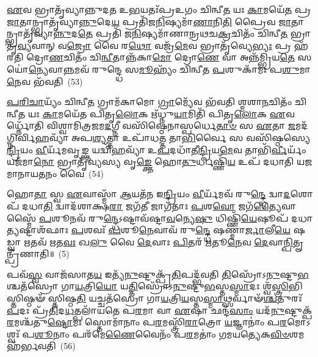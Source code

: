 \-\ul{𑌏}\-𑌵 𑌭𑍍𑌰𑌾𑌤𑍃᳴𑌵𑍍𑌯𑌾𑌨𑍍𑌨𑍁𑌦𑌤 𑌉\-\ul{𑌭}\-𑌯𑌤𑌃᳴𑌪𑍍𑌰𑌉𑌗𑌂 𑌚𑌿𑌨𑍍𑌵𑍀\-\ul{𑌤} 𑌯𑌃 \ul{𑌕𑌾}\-𑌮𑌯𑍇᳴\-\ul{𑌤} 𑌪𑍍𑌰 \ul{𑌜𑌾}\-𑌤𑌾𑌨𑍍𑌭𑍍𑌰𑌾𑌤𑍃᳴𑌵𑍍𑌯𑌾\-\ul{𑌨𑍍𑌨𑍁}\-𑌦𑍇\-\ul{𑌯} 𑌪𑍍𑌰𑌤𑌿᳴𑌜\-\ul{𑌨𑌿}\-𑌷𑍍𑌯𑌮𑌾᳴\-\ul{𑌣𑌾}\-𑌨𑌿\-\ul{𑌤𑌿} 𑌪𑍍𑌰𑍈𑌵 \ul{𑌜𑌾}\-𑌤𑌾𑌨𑍍𑌭𑍍𑌰𑌾𑌤𑍃᳴𑌵𑍍𑌯𑌾\-\ul{𑌨𑍍𑌨𑍁}\-𑌦\-\ul{𑌤𑍇} 𑌪𑍍𑌰𑌤𑌿᳴ 𑌜\-\ul{𑌨𑌿}\-𑌷𑍍𑌯𑌮𑌾᳴𑌣𑌾𑌨𑍍𑌰𑌥𑌚\-\ul{𑌕𑍍𑌰}\-𑌚𑌿𑌤𑌂᳴ 𑌚𑌿𑌨𑍍𑌵𑍀\-\ul{𑌤} 𑌭𑍍𑌰𑌾𑌤𑍃᳴\-\ul{𑌵𑍍𑌯}\-𑌵𑌾𑌨𑍍 𑌵\-\ul{𑌜𑍍𑌰𑍋} 𑌵𑍈 𑌰\-\ul{𑌥𑍋} 𑌵𑌜𑍍𑌰᳴\-\ul{𑌮𑍇}\-𑌵 𑌭𑍍𑌰𑌾𑌤𑍃᳴𑌵𑍍𑌯𑍇\-\ul{𑌭𑍍𑌯𑌃} 𑌪𑍍𑌰 𑌹᳴𑌰𑌤𑌿 𑌦𑍍𑌰𑍋\-\ul{𑌣}\-𑌚𑌿𑌤𑌂᳴ 𑌚𑌿\-\ul{𑌨𑍍𑌵𑍀}\-𑌤𑌾𑌨𑍍𑌨᳴𑌕𑌾\-\ul{𑌮𑍋} 𑌦𑍍𑌰𑍋\-\ul{𑌣𑍇} 𑌵𑌾 𑌅𑌨𑍍𑌨᳴𑌮𑍍𑌭𑍍𑌰𑌿𑌯\-\ul{𑌤𑍇} 𑌸𑌯𑍋॑\-\ul{𑌨𑍍𑌯𑍇}\-𑌵𑌾\-\ul{𑌨𑍍𑌨}\-𑌮𑌵᳴ 𑌰𑍁𑌨𑍍𑌦𑍍𑌧𑍇 𑌸\-\ul{𑌮𑍂}\-𑌹𑍍𑌯𑌂᳴ 𑌚𑌿𑌨𑍍𑌵𑍀𑌤 \ul{𑌪}\-𑌶𑍁𑌕𑌾᳴𑌮𑌃 𑌪\-\ul{𑌶𑍁}\-𑌮𑌾\-\ul{𑌨𑍇}\-𑌵 𑌭᳴𑌵𑌤𑌿~(53)

\-\ul{𑌪}\-\-\ul{𑌰𑌿}\-\-\ul{𑌚𑌾}\-𑌯𑍍𑌯𑌂᳴ 𑌚𑌿𑌨𑍍𑌵𑍀\-\ul{𑌤} 𑌗𑍍𑌰𑌾𑌮᳴𑌕𑌾𑌮𑍋 \ul{𑌗𑍍𑌰𑌾}\-𑌮𑍍𑌯𑍇᳴𑌵 𑌭᳴𑌵𑌤𑌿 𑌶𑍍𑌮𑌶𑌾\-\ul{𑌨}\-𑌚𑌿𑌤𑌂᳴ 𑌚𑌿𑌨𑍍𑌵𑍀\-\ul{𑌤} 𑌯𑌃 \ul{𑌕𑌾}\-𑌮𑌯𑍇᳴𑌤 𑌪𑌿𑌤𑍃\-\ul{𑌲𑍋}\-𑌕 𑌋᳴𑌧𑍍𑌨𑍁\-\ul{𑌯𑌾}\-𑌮𑌿𑌤𑌿᳴ 𑌪𑌿𑌤𑍃\-\ul{𑌲𑍋}\-𑌕 \ul{𑌏}\-𑌵𑌰𑍍𑌧𑍍𑌨𑍋᳴𑌤𑌿 𑌵𑌿𑌶𑍍𑌵𑌾𑌮𑌿𑌤𑍍𑌰𑌜𑌮\-\ul{𑌦}\-𑌗𑍍𑌨𑍀 𑌵𑌸𑌿᳴𑌷𑍍𑌠𑍇𑌨𑌾𑌸𑍍𑌪𑌰𑍍𑌧𑍇\-\ul{𑌤𑌾}\-\-\ul{𑍞} 𑌸 \ul{𑌏}\-𑌤𑌾 \ul{𑌜}\-𑌮𑌦᳴𑌗𑍍𑌨𑌿𑌰𑍍𑌵𑌿\-\ul{𑌹}\-𑌵𑍍𑌯𑌾᳴ 𑌅𑌪\-\ul{𑌶𑍍𑌯}\-𑌤𑍍𑌤𑌾 𑌉𑌪𑌾᳴𑌧\-\ul{𑌤𑍍𑌤} 𑌤𑌾\-\ul{𑌭𑌿}\-𑌰𑍍𑌵𑍈 𑌸 𑌵𑌸𑌿᳴𑌷𑍍𑌠𑌸𑍍𑌯𑍇\-\ul{𑌨𑍍𑌦𑍍𑌰𑌿}\-𑌯𑌂 \ul{𑌵𑍀}\-𑌰𑍍𑌯᳴𑌮𑌵𑍃\-\ul{𑌙𑍍𑌕𑍍𑌤} 𑌯𑌦𑍍𑌵𑌿᳴\-\ul{𑌹}\-𑌵𑍍𑌯𑌾᳴ 𑌉\-\ul{𑌪}\-𑌦𑌧𑌾᳴𑌤𑍀\-\ul{𑌨𑍍𑌦𑍍𑌰𑌿}\-𑌯\-\ul{𑌮𑍇}\-𑌵 𑌤𑌾𑌭𑌿᳴\-\ul{𑌰𑍍𑌵𑍀}\-𑌰𑍍𑌯𑌂᳴ 𑌯𑌜᳴𑌮𑌾\-\ul{𑌨𑍋} 𑌭𑍍𑌰𑌾𑌤𑍃᳴𑌵𑍍𑌯𑌸𑍍𑌯 𑌵𑍃\-\ul{𑌙𑍍𑌕𑍍𑌤𑍇} 𑌹𑍋\-\ul{𑌤𑍁}\-𑌰𑍍𑌧𑌿𑌷𑍍𑌣𑌿᳴\-\ul{𑌯} 𑌉𑌪᳴ 𑌦𑌧𑌾𑌤𑌿 𑌯𑌜𑌮𑌾𑌨𑌾𑌯\-\ul{𑌤}\-𑌨𑌂 𑌵𑍈~(54)

𑌹𑍋\-\ul{𑌤𑌾} 𑌸𑍍𑌵 \ul{𑌏}\-𑌵𑌾𑌸𑍍𑌮𑌾᳴ \ul{𑌆}\-𑌯𑌤᳴𑌨 𑌇\-\ul{𑌨𑍍𑌦𑍍𑌰𑌿}\-𑌯𑌂 \ul{𑌵𑍀}\-𑌰𑍍𑌯᳴𑌮𑌵᳴ 𑌰𑍁\-\ul{𑌨𑍍𑌦𑍍𑌧𑍇} 𑌦𑍍𑌵𑌾\-\ul{𑌦}\-𑌶𑍋𑌪᳴ 𑌦𑌧𑌾\-\ul{𑌤𑌿} 𑌦𑍍𑌵𑌾𑌦᳴𑌶𑌾𑌕𑍍𑌷\-\ul{𑌰𑌾} 𑌜𑌗᳴\-\ul{𑌤𑍀} 𑌜𑌾𑌗᳴𑌤𑌾𑌃 \ul{𑌪}\-𑌶\-\ul{𑌵𑍋} 𑌜𑌗᳴\-\ul{𑌤𑍍𑌯𑍈}\-𑌵𑌾𑌸𑍍𑌮𑍈᳴ \ul{𑌪}\-𑌶𑍂𑌨𑌵᳴ 𑌰𑍁\-\ul{𑌨𑍍𑌦𑍍𑌧𑍇}\-\-𑌽𑌷𑍍𑌟𑌾𑌵᳴𑌷𑍍𑌟𑌾\-\ul{𑌵}\-𑌨𑍍𑌯𑍇\-\ul{𑌷𑍁} 𑌧𑌿𑌷𑍍𑌣𑌿᳴\-\ul{𑌯𑍇}\-𑌷𑍂𑌪᳴ 𑌦𑌧𑌾\-\ul{𑌤𑍍𑌯}\-𑌷𑍍𑌟𑌾𑌶᳴𑌫𑌾𑌃 \ul{𑌪}\-𑌶𑌵𑌃᳴ \ul{𑌪}\-𑌶𑍂\-\ul{𑌨𑍇}\-𑌵𑌾𑌵᳴ 𑌰𑍁\-\ul{𑌨𑍍𑌦𑍍𑌧𑍇} 𑌷𑌣𑍍𑌮𑌾॑\-\ul{𑌰𑍍𑌜𑌾}\-𑌲𑍀\-\ul{𑌯𑍇} 𑌷𑌡𑍍𑌵𑌾 \ul{𑌋}\-𑌤𑌵᳴ \ul{𑌋}\-𑌤\-\ul{𑌵𑌃} 𑌖\-\ul{𑌲𑍁} 𑌵𑍈 \ul{𑌦𑍇}\-𑌵𑌾𑌃 \ul{𑌪𑌿}\-𑌤𑌰᳴ \ul{𑌋}\-𑌤𑍂\-\ul{𑌨𑍇}\-𑌵 \ul{𑌦𑍇}\-𑌵𑌾\-\ul{𑌨𑍍𑌪𑌿}\-𑌤𑍄𑌨𑍍𑌪𑍍𑌰𑍀᳴𑌣𑌾𑌤𑌿॥~(5)

{}%

𑌪𑌵᳴\-\ul{𑌸𑍍𑌵} 𑌵𑌾𑌜᳴𑌸𑌾𑌤\-\ul{𑌯} 𑌇𑌤𑍍𑌯᳴\-\ul{𑌨𑍁}\-𑌷𑍍𑌟𑍁𑌕𑍍𑌪𑍍𑌰᳴\-\ul{𑌤𑌿}\-𑌪𑌦𑍍𑌭᳴𑌵𑌤𑌿 \ul{𑌤𑌿}\-𑌸𑍍𑌰𑍋᳴\-𑌽\-\ul{𑌨𑍁}\-𑌷𑍍𑌟𑍁\-\ul{𑌭}\-𑌶𑍍𑌚𑌤᳴𑌸𑍍𑌰𑍋 𑌗𑌾\-\ul{𑌯}\-𑌤𑍍𑌰𑌿\-\ul{𑌯𑍋} 𑌯\-\ul{𑌤𑍍𑌤𑌿}\-𑌸𑍍𑌰𑍋᳴\-𑌽\-\ul{𑌨𑍁}\-𑌷𑍍𑌟𑍁\-\ul{𑌭}\-𑌸𑍍𑌤\-\ul{𑌸𑍍𑌮𑌾}\-𑌦𑌃 𑌶𑍍𑌵᳴\-\ul{𑌸𑍍𑌤𑍍𑌰𑌿}\-𑌭𑌿𑌸𑍍𑌤𑌿𑌷𑍍𑌠𑍟᳴ 𑌸𑍍𑌤𑌿𑌷𑍍𑌠\-\ul{𑌤𑌿} 𑌯𑌚𑍍𑌚𑌤᳴𑌸𑍍𑌰𑍋 𑌗𑌾\-\ul{𑌯}\-𑌤𑍍𑌰𑌿\-\ul{𑌯}\-𑌸𑍍𑌤\-\ul{𑌸𑍍𑌮𑌾}\-𑌥𑍍𑌸𑌰𑍍𑌵𑌾𑍟᳴\-\ul{𑌶𑍍𑌚}\-𑌤𑍁𑌰𑌃᳴ \ul{𑌪}\-𑌦𑌃 𑌪𑍍𑌰᳴\-\ul{𑌤𑌿}\-𑌦\-\ul{𑌧}\-𑌤𑍍𑌪𑌲𑌾᳴𑌯𑌤𑍇 𑌪\-\ul{𑌰}\-𑌮𑌾 𑌵𑌾 \ul{𑌏}\-𑌷𑌾 𑌛𑌨𑍍𑌦᳴\-\ul{𑌸𑌾𑌂} 𑌯𑌦᳴\-\ul{𑌨𑍁}\-𑌷𑍍𑌟𑍁𑌕𑍍𑌪᳴\-\ul{𑌰}\-𑌮𑌶𑍍𑌚᳴𑌤𑍁\-\ul{𑌷𑍍𑌟𑍋}\-𑌮𑌃 𑌸𑍍𑌤𑍋𑌮𑌾᳴𑌨𑌾𑌂 𑌪\-\ul{𑌰}\-𑌮𑌸𑍍𑌤𑍍𑌰𑌿᳴\-\ul{𑌰𑌾}\-𑌤𑍍𑌰𑍋 \ul{𑌯}\-𑌜𑍍𑌞𑌾𑌨𑌾𑌂॑ 𑌪\-\ul{𑌰}\-𑌮𑍋\-𑌽𑌶𑍍𑌵𑌃᳴ 𑌪\-\ul{𑌶𑍂}\-𑌨𑌾𑌂 𑌪𑌰᳴𑌮𑍇\-\ul{𑌣𑍈}\-𑌵𑍈𑌨𑌂᳴ 𑌪\-\ul{𑌰}\-𑌮𑌤𑌾𑌂॑ 𑌗𑌮𑌯𑌤𑍍𑌯𑍇𑌕\-\ul{𑌵𑌿}\-\-\ul{𑍞}\-𑌶𑌮𑌹᳴𑌰𑍍𑌭𑌵𑌤𑌿~(56)

